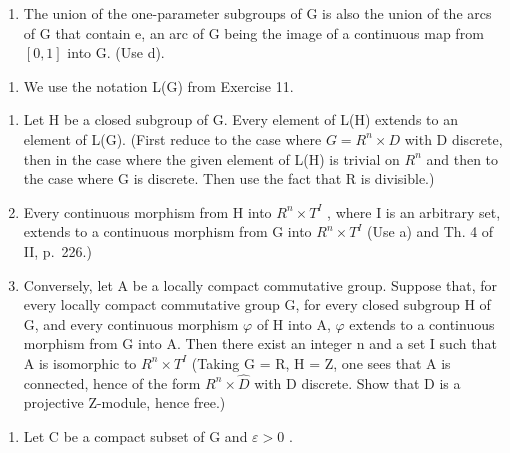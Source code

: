\begin{enumerate}
\def\labelenumi{\alph{enumi})}
\setcounter{enumi}{4}
\tightlist
\item
  The union of the one-parameter subgroups of G is also the union of the arcs of G that contain e, an arc of G being the image of a continuous map from \([0,1]\) into G. (Use d).
\end{enumerate}

\begin{enumerate}
\def\labelenumi{\arabic{enumi})}
\setcounter{enumi}{11}
\tightlist
\item
  We use the notation L(G) from Exercise 11.
\end{enumerate}

\begin{enumerate}
\def\labelenumi{\alph{enumi})}
\item
  Let H be a closed subgroup of G. Every element of L(H) extends to an element of L(G). (First reduce to the case where \(G = R^{n} \times D\) with D discrete, then in the case where the given element of L(H) is trivial on \(R^{n}\) and then to the case where G is discrete. Then use the fact that R is divisible.)
\item
  Every continuous morphism from H into \(R^{n} \times T^{I}\) , where I is an arbitrary set, extends to a continuous morphism from G into \(R^{n} \times T^{I}\) (Use a) and Th. 4 of II, p.~226.)
\item
  Conversely, let A be a locally compact commutative group. Suppose that, for every locally compact commutative group G, for every closed subgroup H of G, and every continuous morphism \(\varphi\) of H into A, \(\varphi\) extends to a continuous morphism from G into A. Then there exist an integer n and a set I such that A is isomorphic to \(R^{n} \times T^{I}\) (Taking G = R, H = Z, one sees that A is connected, hence of the form \(R^{n} \times \widehat{D}\) with D discrete. Show that D is a projective Z-module, hence free.)
\end{enumerate}

\begin{enumerate}
\def\labelenumi{\arabic{enumi})}
\setcounter{enumi}{12}
\tightlist
\item
  Let C be a compact subset of G and \(\varepsilon > 0\) .
\end{enumerate}

